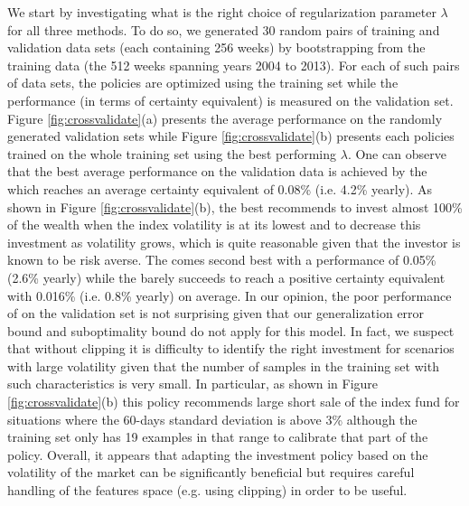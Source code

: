 \documentclass[]{interact}
\theoremstyle{plain}%
\theoremstyle{definition}
\theoremstyle{remark}
\newcommand{\0}{\V{0}}
\newcommand{\1}{\V{1}}
\theoremstyle{plain}
\theoremstyle{definition}
\begin{document}
We start by investigating what is the right choice of regularization parameter $\lambda$ for all three methods. To do so, we generated 30 random pairs of training and validation data sets (each containing 256 weeks) by bootstrapping from the training data (the 512 weeks spanning years 2004 to 2013).  For each of such pairs of data sets, the policies are optimized using the training set while the performance (in terms of certainty equivalent) is measured on the validation set. Figure \ref{fig:crossvalidate}(a) presents the average performance  on the randomly generated validation sets  while Figure \ref{fig:crossvalidate}(b) presents each policies trained on the whole training set using the best performing $\lambda$.  One can observe that the best average performance on the validation data is achieved by the \adaptPclipped{} which reaches an average certainty equivalent of 0.08\% (i.e. 4.2\% yearly). As shown in Figure \ref{fig:crossvalidate}(b), the best \adaptPclipped{} recommends to invest almost 100\% of the wealth when the index volatility is at its lowest and to decrease this investment as volatility grows, which is quite reasonable given that the investor is known to be risk averse.  The \fixedP{} comes second best with a performance of 0.05\% (2.6\% yearly) while the \adaptPstd{} barely succeeds to reach a positive certainty equivalent with 0.016\% (i.e. 0.8\% yearly) on average. In our opinion, the poor performance of \adaptPstd{} on the validation set is not surprising given that our generalization error bound and suboptimality bound do not apply for this model. In fact, we suspect that without clipping it is difficulty to identify the right investment for scenarios with large volatility given that the number of samples in the training set with such characteristics is very small. In particular, as shown in Figure \ref{fig:crossvalidate}(b) this policy recommends large short sale of the index fund for situations where the 60-days standard deviation is above 3\% although the training set only has 19 examples in that range to calibrate that part of the policy. Overall, it appears that adapting the investment policy based on the volatility of the market can be significantly beneficial but requires careful handling of the features space (e.g. using clipping) in order to be useful. 
\end{document}
